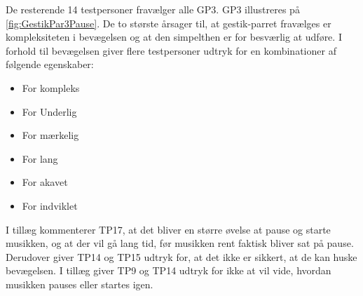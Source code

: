 \noindent
De resterende 14 testpersoner fravælger alle GP3. GP3 illustreres på \autoref{fig:GestikPar3Pause}. De to største årsager til, at gestik-parret fravælges er kompleksiteten i bevægelsen og at den simpelthen er for besværlig at udføre. I forhold til bevægelsen giver flere testpersoner udtryk for en kombinationer af følgende egenskaber:
%
\begin{multicols}{3}
    \begin{itemize}
        \item For kompleks
        \item For Underlig
        \item For mærkelig
        \item For lang
        \item For akavet
        \item For indviklet
\end{itemize}
\end{multicols}
\noindent
%  
I tillæg kommenterer TP17, at det bliver en større øvelse at pause og starte musikken, og at der vil gå lang tid, før musikken rent faktisk bliver sat på pause. Derudover giver TP14 og TP15 udtryk for, at det ikke er sikkert, at de kan huske bevægelsen. I tillæg giver TP9 og TP14 udtryk for ikke at vil vide, hvordan musikken pauses eller startes igen. 

